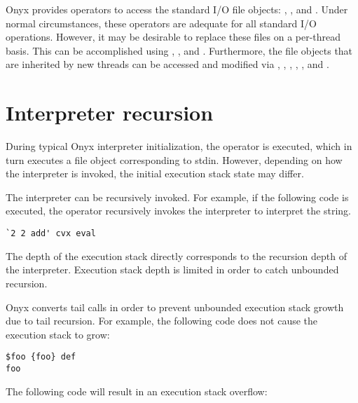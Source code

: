 Onyx provides operators to access the standard I/O file objects:
,
, and
.  Under normal circumstances,
these operators are adequate for all standard I/O operations.  However, it may
be desirable to replace these files on a per-thread basis.  This can be
accomplished using ,
, and
.  Furthermore, the file
objects that are inherited by new threads can be accessed and modified via
,
,
,
,
, and
.

\section{Interpreter recursion}

During typical Onyx interpreter initialization, the
 operator is executed, which in
turn executes a file object corresponding to stdin.  However, depending on how
the interpreter is invoked, the initial execution stack state may differ.

The interpreter can be recursively invoked.  For example, if the following code
is executed, the  operator
recursively invokes the interpreter to interpret the string.
\begin{verbatim}
`2 2 add' cvx eval
\end{verbatim}

The depth of the execution stack directly corresponds to the recursion depth of
the interpreter.  Execution stack depth is limited in order to catch unbounded
recursion.

Onyx converts tail calls in order to prevent unbounded execution stack growth
due to tail recursion.  For example, the following code does not cause the
execution stack to grow:

\begin{verbatim}
$foo {foo} def
foo
\end{verbatim}

The following code will result in an execution stack overflow:

